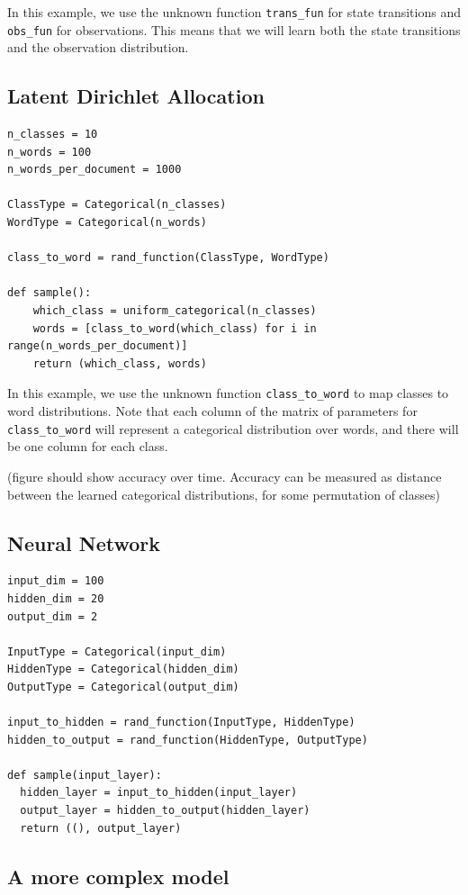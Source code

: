\documentclass[proceed]{article}
\begin{document}
In this example, we use the unknown function \texttt{trans\_fun} for state transitions and \texttt{obs\_fun} for observations.  This means that we will learn both the state transitions and the observation distribution.


\subsection{Latent Dirichlet Allocation}

\begin{verbatim}
n_classes = 10
n_words = 100
n_words_per_document = 1000

ClassType = Categorical(n_classes)
WordType = Categorical(n_words)

class_to_word = rand_function(ClassType, WordType)

def sample():
    which_class = uniform_categorical(n_classes)
    words = [class_to_word(which_class) for i in range(n_words_per_document)]
    return (which_class, words)
\end{verbatim}

In this example, we use the unknown function \texttt{class\_to\_word} to map classes to word distributions.  Note that each column of the matrix of parameters for \texttt{class\_to\_word} will represent a categorical distribution over words, and there will be one column for each class.

(figure should show accuracy over time.  Accuracy can be measured as distance between the learned categorical distributions, for some permutation of classes)

\subsection{Neural Network}

\begin{verbatim}
input_dim = 100
hidden_dim = 20
output_dim = 2

InputType = Categorical(input_dim)
HiddenType = Categorical(hidden_dim)
OutputType = Categorical(output_dim)

input_to_hidden = rand_function(InputType, HiddenType)
hidden_to_output = rand_function(HiddenType, OutputType)

def sample(input_layer):
  hidden_layer = input_to_hidden(input_layer)
  output_layer = hidden_to_output(hidden_layer)
  return ((), output_layer)
\end{verbatim}

\subsection{A more complex model}
\end{document}
